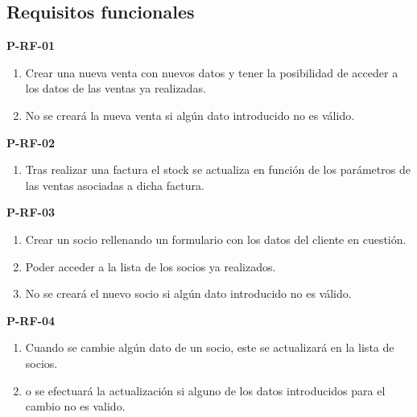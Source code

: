 \subsection{Requisitos funcionales}

\textbf{P-RF-01}
\begin{enumerate}
	\item Crear una nueva venta con nuevos datos y tener la posibilidad de acceder a los datos de las ventas ya realizadas.
	\item No se creará la nueva venta si algún dato introducido no es válido.
\end{enumerate}

\textbf{P-RF-02}
\begin{enumerate}
	\item Tras realizar una factura el stock se actualiza en función de los parámetros de las ventas asociadas a dicha factura.
\end{enumerate}

\textbf{P-RF-03}
\begin{enumerate}
	\item Crear un socio rellenando un formulario con los datos del cliente en cuestión.
	\item Poder acceder a la lista de los socios ya realizados.
	\item No se creará el nuevo socio si algún dato introducido no es válido.
\end{enumerate}

\textbf{P-RF-04}
\begin{enumerate}
	\item Cuando se cambie algún dato de un socio, este se actualizará en la lista de socios.
	\item o se efectuará la actualización si alguno de los datos introducidos para el cambio no es valido.
\end{enumerate}

